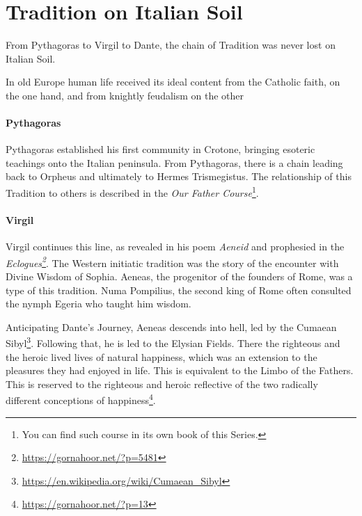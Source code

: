\section{Tradition on Italian Soil}

\begin{quotex}
From Pythagoras to Virgil to Dante, the chain of Tradition was never lost on Italian Soil.

In old Europe human life received its ideal content from the Catholic faith, on the one hand, and from knightly feudalism on the other
\end{quotex}


\paragraph{Pythagoras}


Pythagoras established his first community in Crotone, bringing esoteric teachings onto the Italian peninsula. From Pythagoras, there is a chain leading back to Orpheus and ultimately to Hermes Trismegistus. The relationship of this Tradition to others is described in the \textit{Our Father Course}\footnote{You can find such course in its own book of this Series.}.

\paragraph{Virgil}

Virgil continues this line, as revealed in his poem \emph{Aeneid} and prophesied in the \emph{Eclogues\footnote{\url{https://gornahoor.net/?p=5481}}}. The Western initiatic tradition was the story of the encounter with Divine Wisdom of Sophia. Aeneas, the progenitor of the founders of Rome, was a type of this tradition. Numa Pompilius, the second king of Rome often consulted the nymph Egeria who taught him wisdom.

Anticipating Dante's Journey, Aeneas descends into hell, led by the Cumaean Sibyl\footnote{\url{https://en.wikipedia.org/wiki/Cumaean_Sibyl}}. Following that, he is led to the Elysian Fields. There the righteous and the heroic lived lives of natural happiness, which was an extension to the pleasures they had enjoyed in life. This is equivalent to the Limbo of the Fathers. This is reserved to the righteous and heroic reflective of the two radically different conceptions of happiness\footnote{\url{https://gornahoor.net/?p=13}}.


